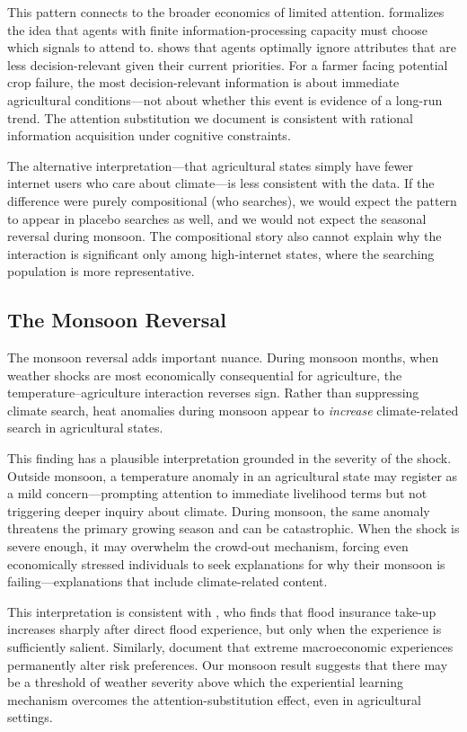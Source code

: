 \documentclass[12pt]{article}
\begin{document}
This pattern connects to the broader economics of limited attention. \citet{sims2003rational} formalizes the idea that agents with finite information-processing capacity must choose which signals to attend to. \citet{gabaix2014sparsity} shows that agents optimally ignore attributes that are less decision-relevant given their current priorities. For a farmer facing potential crop failure, the most decision-relevant information is about immediate agricultural conditions---not about whether this event is evidence of a long-run trend. The attention substitution we document is consistent with rational information acquisition under cognitive constraints.

The alternative interpretation---that agricultural states simply have fewer internet users who care about climate---is less consistent with the data. If the difference were purely compositional (who searches), we would expect the pattern to appear in placebo searches as well, and we would not expect the seasonal reversal during monsoon. The compositional story also cannot explain why the interaction is significant only among high-internet states, where the searching population is more representative.

\subsection{The Monsoon Reversal}

The monsoon reversal adds important nuance. During monsoon months, when weather shocks are most economically consequential for agriculture, the temperature--agriculture interaction reverses sign. Rather than suppressing climate search, heat anomalies during monsoon appear to \textit{increase} climate-related search in agricultural states.

This finding has a plausible interpretation grounded in the severity of the shock. Outside monsoon, a temperature anomaly in an agricultural state may register as a mild concern---prompting attention to immediate livelihood terms but not triggering deeper inquiry about climate. During monsoon, the same anomaly threatens the primary growing season and can be catastrophic. When the shock is severe enough, it may overwhelm the crowd-out mechanism, forcing even economically stressed individuals to seek explanations for why their monsoon is failing---explanations that include climate-related content.

This interpretation is consistent with \citet{gallagher2014learning}, who finds that flood insurance take-up increases sharply after direct flood experience, but only when the experience is sufficiently salient. Similarly, \citet{malmendier2011depression} document that extreme macroeconomic experiences permanently alter risk preferences. Our monsoon result suggests that there may be a threshold of weather severity above which the experiential learning mechanism overcomes the attention-substitution effect, even in agricultural settings.
\end{document}

